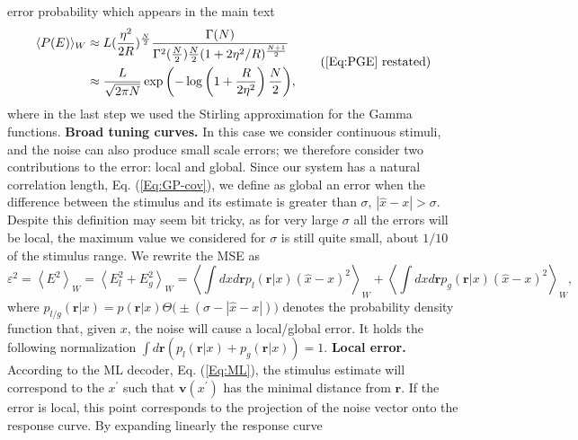 \documentclass[a4paper]{article}%
\begin{document}
error probability which appears in the main text
\begin{equation}%
\begin{split}
\langle P(E)\rangle_{W}  &  \approx L (\frac{\eta^{2}}{2R})^{\frac{N}{2}}
\frac{\Gamma(N)}{\Gamma^{2}(\frac{N}{2}) \frac{N}{2} (1+2\eta^{2}%
/R)^{\frac{N+1}{2}}}\\
&  \approx\frac{L}{\sqrt{2\pi N}} \exp{\left(  - \log\left(  1 + \frac
{R}{2\eta^{2}}\right)  \frac{N}{2}\right)  },
\end{split}
\tag{\ref{Eq:PGE} restated}%
\end{equation}
where in the last step we used the Stirling approximation for the Gamma
functions. 
\newline\newline
\textbf{Broad tuning curves.} In this case we consider continuous stimuli, and the noise can also produce small scale errors; we therefore consider two contributions to the error:
local and global. Since our system has a natural correlation length, Eq.
(\ref{Eq:GP-cov}), we define as global an error when the difference between
the stimulus and its estimate is greater than $\sigma$, $|\hat{x} - x |>
\sigma$. 
Despite this definition may seem bit tricky, as for very large $\sigma$ all the
errors will be local, the maximum value we considered for $\sigma$ is still quite small, about $1/10$ of the stimulus range. 
We rewrite the MSE as
\begin{equation}
\varepsilon^{2} = \left\langle E^{2} \right\rangle _{W}= \left\langle
E_{l}^{2} + E_{g}^{2} \right\rangle _{W}= \left\langle \int dx d\mathbf{r}
p_{l} \left(  \mathbf{r}|x\right)  \left(  \hat{x} -x \right)  ^{2}%
\right\rangle _{W} + \left\langle \int dx d\mathbf{r}p_{g}(\mathbf{r}|x)
\left(  \hat{x} -x \right)  ^{2} \right\rangle _{W},
\end{equation}
where $p_{l/g}(\mathbf{r}|x) = p(\mathbf{r}|x) \Theta\big(\pm(\sigma- |\hat
{x}-x|)\big)$ denotes the probability density function that, given $x$, the
noise will cause a local/global error. It holds the following normalization
$\int d\mathbf{r} \left(p_{l}(\mathbf{r}|x) + p_{g} (\mathbf{r}|x)\right)=1$.
\newline\newline\textbf{Local error.} According to the ML decoder, Eq.
(\ref{Eq:ML}), the stimulus estimate will correspond to the $x^{\prime}$ such
that $\mathbf{v}(x^{\prime})$ has the minimal distance from $\mathbf{r}$. If
the error is local, this point corresponds to the projection of the noise
vector onto the response curve. By expanding linearly the response curve
\end{document}
